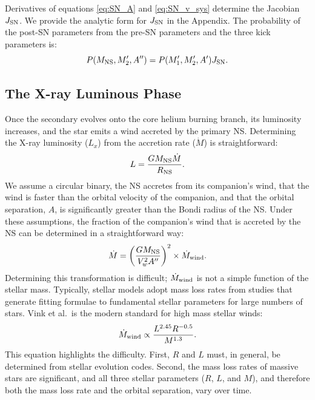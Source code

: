 \documentclass[12pt, preprint]{aastex}
\begin{document}
Derivatives of equations \ref{eq:SN_A} and \ref{eq:SN_v_sys} determine the Jacobian $J_{\rm SN}$. We provide the analytic form for $J_{\rm SN}$ in the Appendix. The probability of the post-SN parameters from the pre-SN parameters and the three kick parameters is:
\begin{equation}
P(M_{\rm NS}, M_2', A'') = P(M_1', M_2', A') J_{\rm SN}. \label{eq:P_SN}
\end{equation}





\subsection{The X-ray Luminous Phase} \label{sec:trans_XRB}

Once the secondary evolves onto the core helium burning branch, its luminosity increases, and the star emits a wind accreted by the primary NS. Determining the X-ray luminosity ($L_x$) from the accretion rate ($\dot{M}$) is straightforward: 
\begin{equation}
L = \frac{G M_{\rm NS} \dot{M}}{R_{\rm NS}}.
\end{equation}
We assume a circular binary, the NS accretes from its companion's wind, that the wind is faster than the orbital velocity of the companion, and that the orbital separation, $A$, is significantly greater than the Bondi radius of the NS. Under these assumptions, the fraction of the companion's wind that is accreted by the NS can be determined in a straightforward way:
\begin{equation}
\dot{M} = \left( \frac{G M_{\rm NS}}{V_w^2 A''} \right)^2 \times \dot{M}_{\rm wind}.
\end{equation}
Determining this transformation is difficult; $\dot{M}_{\rm wind}$ is not a simple function of the stellar mass. Typically, stellar models adopt mass loss rates from studies that generate fitting formulae to fundamental stellar parameters for large numbers of stars. Vink et al.\ is the modern standard for high mass stellar winds:
\begin{equation}
\dot{M}_{\rm wind} \propto \frac{L^{2.45} R^{-0.5}}{M^{1.3}}. \label{eq:vink}
\end{equation}
This equation highlights the difficulty. First, $R$ and $L$ must, in general, be determined from stellar evolution codes. Second, the mass loss rates of massive stars are significant, and all three stellar parameters ($R$, $L$, and $M$), and therefore both the mass loss rate and the orbital separation, vary over time. 
\end{document}
